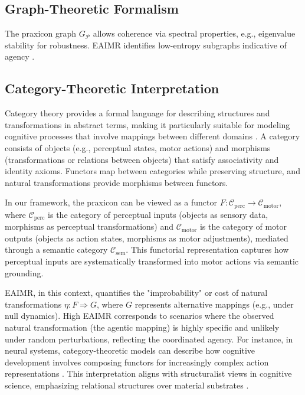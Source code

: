 \documentclass{article}
\begin{document}
\subsection{Graph-Theoretic Formalism}
The praxicon graph \(G_{\mathcal{P}}\) allows coherence via spectral properties, e.g., eigenvalue stability for robustness. EAIMR identifies low-entropy subgraphs indicative of agency \citep{newell1990}.

\subsection{Category-Theoretic Interpretation}
Category theory provides a formal language for describing structures and transformations in abstract terms, making it particularly suitable for modeling cognitive processes that involve mappings between different domains \citep{healy2022, phillips2021}. A category consists of objects (e.g., perceptual states, motor actions) and morphisms (transformations or relations between objects) that satisfy associativity and identity axioms. Functors map between categories while preserving structure, and natural transformations provide morphisms between functors.

In our framework, the praxicon can be viewed as a functor \(F: \mathcal{C}_{\text{perc}} \to \mathcal{C}_{\text{motor}}\), where \(\mathcal{C}_{\text{perc}}\) is the category of perceptual inputs (objects as sensory data, morphisms as perceptual transformations) and \(\mathcal{C}_{\text{motor}}\) is the category of motor outputs (objects as action states, morphisms as motor adjustments), mediated through a semantic category \(\mathcal{C}_{\text{sem}}\). This functorial representation captures how perceptual inputs are systematically transformed into motor actions via semantic grounding.

EAIMR, in this context, quantifies the "improbability" or cost of natural transformations \(\eta: F \Rightarrow G\), where \(G\) represents alternative mappings (e.g., under null dynamics). High EAIMR corresponds to scenarios where the observed natural transformation (the agentic mapping) is highly specific and unlikely under random perturbations, reflecting the coordinated agency. For instance, in neural systems, category-theoretic models can describe how cognitive development involves composing functors for increasingly complex action representations \citep{ehresmann1980}. This interpretation aligns with structuralist views in cognitive science, emphasizing relational structures over material substrates \citep{ehresmann2021}.
\end{document}
